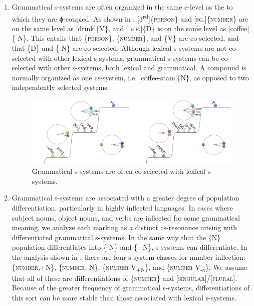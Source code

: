 \begin{enumerate}
\item Grammatical s-systems are often organized in the same e-level as the  to which they are ϕ-coupled. As shown in {}, [3\textsuperscript{rd}]\{\textsc{person}\} and [\textsc{sg.}]\{\textsc{number}\} are on the same level as [drink]\{V\}, and [\textsc{def}.]\{D\} is on the same level as [coffee]\{-N\}. This entails that \{\textsc{person}\}, \{\textsc{number}\}, and \{V\} are co-selected, and that \{D\} and \{-N\} are co-selected. Although lexical s-systems are not co-selected with other lexical s-systems, grammatical s-systems can be co-selected with other s-systems, both lexical and grammatical. A compound  is normally organized as one cs-system, i.e. [coffee-stain]\{N\}, as opposed to two independently selected systems.

  
\begin{figure}
\includegraphics[width=\textwidth]{figures/Tilsen-img66.png}
\caption{Grammatical s-systems are often co-selected with lexical s-systems.}
\label{fig:4:16}
\end{figure}
 

\item  Grammatical s-systems are associated with a greater degree of population differentiation, particularly in highly inflected languages. In cases where subject nouns, object nouns, and verbs are inflected for some grammatical meaning, we analyze each  marking as a distinct cs-resonance arising with differentiated grammatical s-systems. In the same way that the \{N\} population differentiates into \{-N\} and \{+N\},  s-systems can differentiate. In the analysis shown in {}, there are four s-system classes for number inflection: \{\textsc{number},+N\}, \{\textsc{number},-N\}, \{\textsc{number}{}-\textsc{V}\textsc{\textsubscript{+N}}\textsc{\}}, and  \{\textsc{number}{}-\textsc{V}\textsc{\textsubscript{{}-n}}\textsc{\}}. We assume that all of these are differentiations of \{\textsc{number}\} and [\textsc{singular}]/[\textsc{plural}]. Because of the greater frequency of grammatical s-systems, differentiations of this sort can be more stable than those associated with lexical s-systems. 


\end{enumerate}
